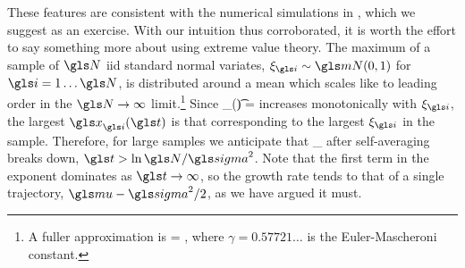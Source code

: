 These features are consistent with the numerical simulations in , which we suggest as an exercise. With our intuition thus corroborated, it is worth the effort to say something more about  using extreme value theory. The maximum of a sample of $\N$ iid standard normal variates, $\xi_\gi\sim\mN(0,1)$ for $\gi=1\dots\N$, is distributed around a mean which scales like
\be
{} \approx \sqrt{2\ln\N}
\ee
to leading order in the $\N\to\infty$ limit.\footnote{A fuller approximation is
\be
{} = ,
\ee
where $\gamma=0.57721\dots$ is the Euler-Mascheroni constant.} Since
\be
\x_\gi(\t) = \exp{}
\ee
increases monotonically with $\xi_\gi$, the largest $\x_\gi(\t)$ is that corresponding to the largest $\xi_\gi$ in the sample. Therefore, for large samples we anticipate that
\be
\ave{\x(\t)}_\N \approx {} \exp{}
\ee
after self-averaging breaks down, $\t>\ln\N/\gsigma^2$. Note that the first term in the exponent dominates as $\t\to\infty$, so the growth rate tends to that of a single trajectory, $\gmu-\gsigma^2/2$, as we have argued it must.


